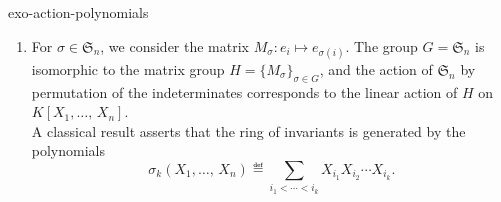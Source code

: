  
\begin{correction}{exo-action-polynomials}
\begin{enumerate}
\item For $ \sigma \in \mathfrak{S}_n $, we consider the matrix $ M_\sigma: e_i \mapsto e_{\sigma (i)} $. The group $ G = \mathfrak{S}_n $ is isomorphic to the matrix group $ H = \{M_\sigma\}_{\sigma \in G} $, and the action of $ \mathfrak{S}_n $ by permutation of the indeterminates corresponds to the linear action of $ H $ on $ K [X_1, \ldots, \, X_n] $. \\A classical result asserts that the ring of invariants is generated by the polynomials
\begin{equation*}
\sigma_k (X_1, \ldots, \, X_n) \eqdef \sum_{i_1 <\cdots <i_k}{X_{i_1} X_{i_2} \cdots X_{i_k}}.
\end{equation*}
 

\end{enumerate}
\end{correction}
